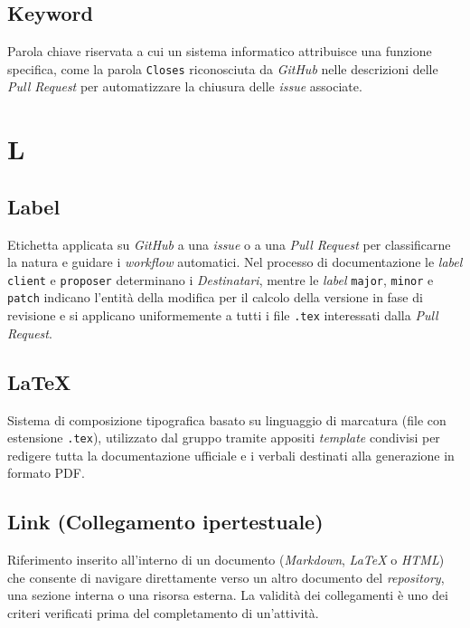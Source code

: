 \documentclass[11pt, a4paper]{article}
\begin{document}
\subsection*{Keyword}
Parola chiave riservata a cui un sistema informatico attribuisce una funzione specifica, come la parola \texttt{Closes} riconosciuta da \textit{GitHub} nelle descrizioni delle \textit{Pull Request} per automatizzare la chiusura delle \textit{issue} associate.

\newpage

\section*{L}

\subsection*{Label}
Etichetta applicata su \textit{GitHub} a una \textit{issue} o a una \textit{Pull Request} per classificarne la natura e guidare i \textit{workflow} automatici. Nel processo di documentazione le \textit{label} \texttt{client} e \texttt{proposer} determinano i \textit{Destinatari}, mentre le \textit{label} \texttt{major}, \texttt{minor} e \texttt{patch} indicano l'entità della modifica per il calcolo della versione in fase di revisione e si applicano uniformemente a tutti i file \texttt{.tex} interessati dalla \textit{Pull Request}.

\subsection*{LaTeX}
Sistema di composizione tipografica basato su linguaggio di marcatura (file con estensione \texttt{.tex}), utilizzato dal gruppo tramite appositi \textit{template} condivisi per redigere tutta la documentazione ufficiale e i verbali destinati alla generazione in formato PDF.

\subsection*{Link (Collegamento ipertestuale)}
Riferimento inserito all'interno di un documento (\textit{Markdown}, \textit{LaTeX} o \textit{HTML}) che consente di navigare direttamente verso un altro documento del \textit{repository}, una sezione interna o una risorsa esterna. La validità dei collegamenti è uno dei criteri verificati prima del completamento di un'attività.
\end{document}
